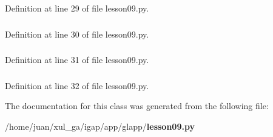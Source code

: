 Definition at line 29 of file lesson09.py.
\subsubsection{}\label{classapp_1_1glapp_1_1lesson09_1_1star_1d94414a4684509bf8a965c50ad3d9c4}




Definition at line 30 of file lesson09.py.
\subsubsection{}\label{classapp_1_1glapp_1_1lesson09_1_1star_e3acf654b7a24133b2b882ccfd7690d9}




Definition at line 31 of file lesson09.py.
\subsubsection{}\label{classapp_1_1glapp_1_1lesson09_1_1star_01cda131a33990820f4ab0fc8fc5c4ab}




Definition at line 32 of file lesson09.py.

The documentation for this class was generated from the following file:\begin{CompactItemize}
\item 
/home/juan/xul\_\-ga/igap/app/glapp/{\bf lesson09.py}\end{CompactItemize}
